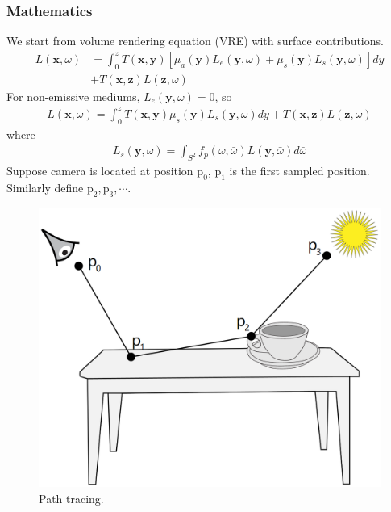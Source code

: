 \documentclass[acmtog]{acmart}
\def\x{\mathrm{\mathbf{x}}}
\def\y{\mathrm{\mathbf{y}}}
\def\z{\mathrm{\mathbf{z}}}
\def\w{\omega}
\def\p{\mathrm{p}}
\begin{document}
\subsubsection{Mathematics}
We start from volume rendering equation (VRE) with surface contributions.
\begin{equation} \label{eq1}
	\begin{split}
		L(\x,\w) &= \int_0^z T(\x,\y)[\mu_a(\y)L_e(\y,\w)+\mu_s(\y)L_s(\y,\w)]dy\\
		&+T(\x,\z)L(\z,\w)
	\end{split}
\end{equation}
For non-emissive mediums, $L_e(\y,\w)=0$, so
\begin{equation} \label{eq2}
	\begin{split}
		L(\x,\w) = \int_0^z T(\x,\y)\mu_s(\y)L_s(\y,\w)dy+T(\x,\z)L(\z,\w)
	\end{split}
\end{equation}
where
\begin{equation} \label{eq3}
	\begin{split}
		L_s(\y,\w) = \int_{S^2}f_p(\w,\bar{\w})L(\y,\bar{\w})d\bar{\w}
	\end{split}
\end{equation}
Suppose camera is located at position $\p_0$, $\p_1$ is the first sampled position.
Similarly define $\p_2, \p_3, \cdots$.
\begin{figure}[H]
	\includegraphics[scale=0.1]{pictures/path tracing.png}
	\centering
	\caption{Path tracing.}
\end{figure}
\end{document}
